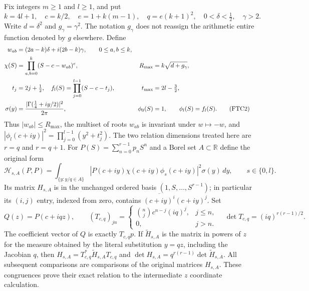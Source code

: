 Fix integers $m\ge1$ and $l\ge1$, and put
\begin{equation}
 k=4l+1,\quad c=k/2,\quad e=1+k(m-1),\quad q=e(k+1)^2,
 \quad 0<\delta<\tfrac12,\quad \gamma>2.
 \tag{FTC1}
\end{equation}
Write $d=\delta^2$ and $g_\gamma=\gamma^2$.  The notation $g_\gamma$
does not reassign the arithmetic entire function denoted by $g$ elsewhere.
Define
\begin{align}
 w_{ab}&=(2a-k)\delta+i(2b-k)\gamma,\qquad 0\le a,b\le k,\notag\\
 \chi(S)&=\prod_{a,b=0}^k(S-c-w_{ab})^e,
 &R_{\max}&=k\sqrt{d+g_\gamma},\notag\\
 t_j&=2j+\tfrac12,\quad
 f_l(S)=\prod_{j=0}^{l-1}(S-c-t_j),
 &t_{\max}&=2l-\tfrac32,\notag\\
 \sigma(y)&=\frac{|\Gamma(\tfrac14+iy/2)|^2}{2\pi},
 &\phi_0(S)&=1,\qquad \phi_l(S)=f_l(S).
 \tag{FTC2}
\end{align}
Thus $|w_{ab}|\le R_{\max}$, the multiset of roots $w_{ab}$ is invariant
under $w\mapsto-w$, and
$|\phi_l(c+iy)|^2=\prod_{j=0}^{l-1}(y^2+t_j^2)$.
The two relation dimensions treated here are $r=q$ and $r=q+1$.
For $P(S)=\sum_{n=0}^{r-1}p_nS^n$ and a Borel set $A\subset\mathbb R$
define the original form
\begin{equation}
 \mathcal H_{s,A}(P,P)=
 \int_{\{y:y/q\in A\}}
 |P(c+iy)\chi(c+iy)\phi_s(c+iy)|^2\sigma(y)\,dy,
 \qquad s\in\{0,l\}.
 \tag{FTC3}
\end{equation}
Its matrix $H_{s,A}$ is in the unchanged ordered basis
$(1,S,\ldots,S^{r-1})$; in particular its $(i,j)$ entry, indexed from zero,
contains $\overline{(c+iy)^i}(c+iy)^j$.  Set
\begin{equation}
 Q(z)=P(c+iqz),\qquad
 (T_{c,q})_{jn}=\begin{cases}
 \binom nj c^{n-j}(iq)^j,&j\le n,\\0,&j>n.
 \end{cases}
 \quad \det T_{c,q}=(iq)^{r(r-1)/2}.
 \tag{FTC4}
\end{equation}
The coefficient vector of $Q$ is exactly $T_{c,q}p$.  If $\widetilde H_{s,A}$
is the matrix in powers of $z$ for the measure obtained by the literal
substitution $y=qz$, including the Jacobian $q$, then
$H_{s,A}=T_{c,q}^*\widetilde H_{s,A}T_{c,q}$ and
$\det H_{s,A}=q^{r(r-1)}\det\widetilde H_{s,A}$.
All subsequent comparisons are comparisons of the original matrices
$H_{s,A}$.  These congruences prove their exact relation to the intermediate
$z$ coordinate calculation.

